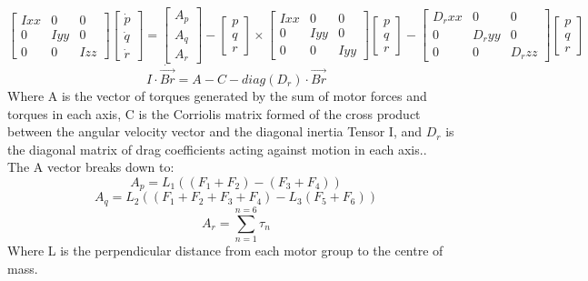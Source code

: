 \documentclass[12pt,a4paper,twoside]{report}
\begin{document}
				\begin{equation}
				\begin{bmatrix}
					Ixx & 0 & 0 \\
					0 & Iyy & 0 \\
					0 & 0 & Izz
				\end{bmatrix} 
				\begin{bmatrix}
					\dot{p} \\
					\dot{q} \\
					\dot{r}
				\end{bmatrix}
				=
				\begin{bmatrix}
					A_p \\
					A_q \\
					A_r
				\end{bmatrix}
				-
				\begin{bmatrix}
					p \\
					q \\
					r 
				\end{bmatrix}
				\times
				\begin{bmatrix}
					Ixx & 0 & 0 \\
					0 & Iyy & 0 \\
					0 & 0 & Iyy
				\end{bmatrix}
				\begin{bmatrix}
					p \\
					q \\
					r 
				\end{bmatrix}
				-
				\begin{bmatrix}
					D_rxx & 0 & 0 \\
					0 & D_ryy & 0 \\
					0 & 0 & D_rzz
				\end{bmatrix}
				\begin{bmatrix}
					p \\
					q \\
					r
				\end{bmatrix}
				\end{equation} 
				\[ I \cdot \dot{\vec{Br}} = A - C -  diag(D_r) \cdot \vec{Br}  \]
				Where A is the vector of torques generated by the sum of motor forces and torques in each axis, C is the Corriolis matrix formed of the cross product between the angular velocity vector and the diagonal inertia Tensor I, and \(D_r\) is the diagonal matrix of drag coefficients acting against motion in each axis.. 
				\\
				The A vector breaks down to:
				\begin{equation}
				 A_p = L_1 ((F_1+F_2) - (F_3+F_4))
				\end{equation}
				\begin{equation}
				 A_q = L_2 ((F_1+F_2+F_3+F_4) - L_3 (F_5+F_6)) 
				\end{equation}
				\begin{equation}
				 A_r = \sum_{n = 1}^{n = 6}\tau_n 
				\end{equation}
				Where L is the perpendicular distance from each motor group to the centre of mass.
					
\end{document}
